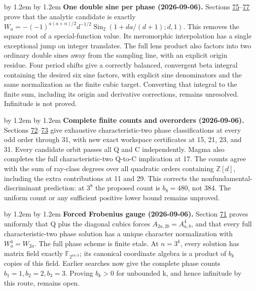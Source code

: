 \documentclass[11pt,reqno]{amsart}
\theoremstyle{plain}
\newenvironment{revnote}%
  {\par\addvspace{0.7\baselineskip}\begingroup\small
   \advance\leftskip by 1.2em \advance\rightskip by 1.2em \noindent\ignorespaces}%
  {\par\endgroup\addvspace{0.7\baselineskip}}
\begin{document}
\begin{revnote}
\textbf{One double sine per phase (2026-09-06).} Sections \hyperref[sec:75]{75}--\hyperref[sec:77]{77} prove that the analytic candidate is exactly \(W_a=-(-1)^{a(a+n)/2}d^{-1/2}\operatorname{Sin}_2(1+da/(d+1);d,1)\). This removes the square root of a special-function value. Its meromorphic interpolation has a single exceptional jump on integer translates. The full lens product also factors into two ordinary double sines away from the sampling line, with an explicit origin residue. Four period shifts give a correctly balanced, convergent beta integral containing the desired six sine factors, with explicit sine denominators and the same normalization as the finite cubic target. Converting that integral to the finite sum, including its origin and derivative corrections, remains unresolved. Infinitude is not proved.
\end{revnote}

\begin{revnote}
\textbf{Complete finite counts and overorders (2026-09-06).} Sections \hyperref[sec:72]{72}--\hyperref[sec:73]{73} give exhaustive characteristic-two phase classifications at every odd order through 31, with new exact workspace certificates at 15, 21, 23, and 31. Every candidate orbit passes all Q and C independently. Magma also completes the full characteristic-two Q-to-C implication at 17. The counts agree with the sum of ray-class degrees over all quadratic orders containing \(\mathbb Z[d]\), including the extra contributions at 11 and 29. This corrects the nonfundamental-discriminant prediction: at \(3^8\) the proposed count is \(b_8=480\), not 384. The uniform count or any sufficient positive lower bound remains unproved.
\end{revnote}

\begin{revnote}
\textbf{Forced Frobenius gauge (2026-09-06).} Section \hyperref[sec:71]{71} proves uniformly that Q plus the diagonal cubics forces \(A_{2a,2b}=A_{a,b}^4\), and that every full characteristic-two phase solution has a unique character normalization with \(W_a^4=W_{2a}\). The full phase scheme is finite etale. At \(n=3^k\), every solution has matrix field exactly \(\mathbb F_{2^{4n/3}}\); its canonical coordinate algebra is a product of \(b_k\) copies of this field. Earlier searches now give the complete phase counts \(b_1=1,b_2=2,b_3=3\). Proving \(b_k>0\) for unbounded k, and hence infinitude by this route, remains open.
\end{revnote}
\end{document}
